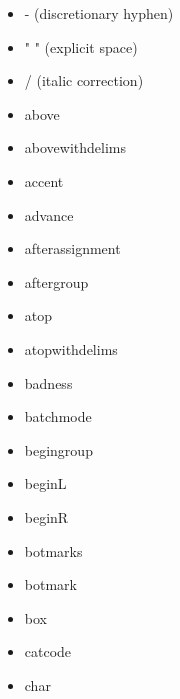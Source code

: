 \begin{itemize}
  \item - (discretionary hyphen)
  \item " " (explicit space)
  \item / (italic correction)
  \item above
  \item abovewithdelims
  \item accent
  \item advance
  \item afterassignment
  \item aftergroup
  \item atop
  \item atopwithdelims
  \item badness
  \item batchmode
  \item begingroup
  \item beginL
  \item beginR
  \item botmarks
  \item botmark
  \item box
  \item catcode
  \item char
  \item chardef
  \item cleaders
  \item closein
  \item closeout
  \item copy
  \item countdef
  \item count
  \item cr
  \item crcr
  \item creationdate
  \item csname
  \item currentgrouplevel
  \item currentgrouptype
  \item currentifbranch
  \item currentiflevel
  \item currentiftype
  \item deadcycles
  \item def
  \item delcode
  \item delimiter
  \item detokenize
  \item dimendef
  \item dimen

\end{itemize}
